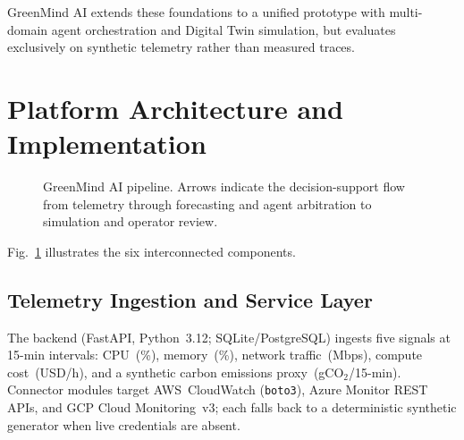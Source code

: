 \documentclass[conference]{IEEEtran}
\begin{document}
GreenMind AI extends these foundations to a unified prototype with
multi-domain agent orchestration and Digital Twin simulation, but evaluates
exclusively on synthetic telemetry rather than measured traces.

\section{Platform Architecture and Implementation}

\begin{figure}[t]
  \centering
  \caption{GreenMind AI pipeline. Arrows indicate the decision-support flow from telemetry through forecasting and agent arbitration to simulation and operator review.}
  \label{fig:arch}
\end{figure}

Fig.~\ref{fig:arch} illustrates the six interconnected components.

\subsection{Telemetry Ingestion and Service Layer}
The backend (FastAPI, Python~3.12; SQLite/PostgreSQL) ingests five signals
at 15-min intervals: CPU~(\%), memory~(\%), network traffic~(Mbps), compute
cost~(USD/h), and a synthetic carbon emissions proxy~(gCO$_2$/15-min).
Connector modules target AWS~CloudWatch (\texttt{boto3}), Azure Monitor REST
APIs, and GCP Cloud Monitoring~v3; each falls back to a deterministic
synthetic generator when live credentials are absent.
\end{document}
